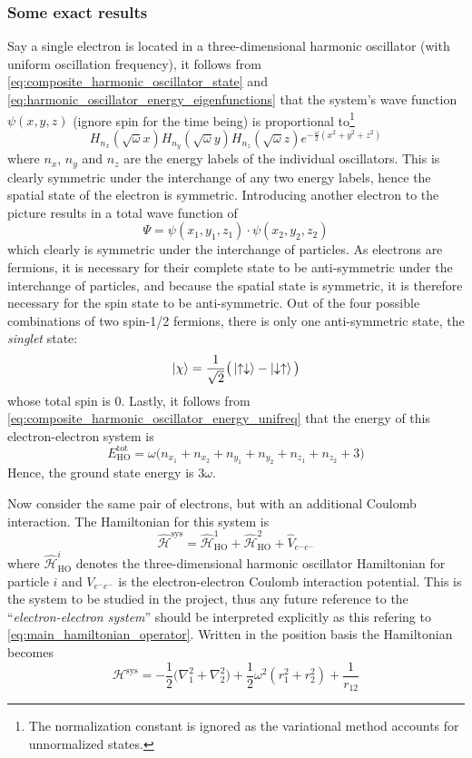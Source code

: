 \documentclass[nofootinbib,reprint,english]{revtex4-1}
\newcommand{\hatHH}{\hat{\mathcal{H}}}
\newcommand{\HH}{\mathcal{H}}
\begin{document}
\subsubsection{Some exact results}
Say a single electron is located in a three-dimensional harmonic oscillator (with uniform oscillation frequency), it follows from \eqref{eq:composite_harmonic_oscillator_state} and \eqref{eq:harmonic_oscillator_energy_eigenfunctions} that the system's wave function \(\psi(x,y,z)\) (ignore spin for the time being) is proportional to\footnote{The normalization constant is ignored as the variational method accounts for unnormalized states.}
\begin{equation*}
H_{n_x}(\sqrt{\omega}x)H_{n_y}(\sqrt{\omega}y)H_{n_z}(\sqrt{\omega}z)e^{-\displaystyle\frac{\omega}{2}(x^2+y^2+z^2)}
\end{equation*}
where \(n_x\), \(n_y\) and \(n_z\) are the energy labels of the individual oscillators. This is clearly symmetric under the interchange of any two energy labels, hence the spatial state of the electron is symmetric. Introducing another electron to the picture results in a total wave function of
\[\Psi=\psi(x_1,y_1,z_1)\cdot\psi(x_2,y_2,z_2)\]
which clearly is symmetric under the interchange of particles. As electrons are fermions, it is necessary for their complete state to be anti-symmetric under the interchange of particles, and because the spatial state is symmetric, it is therefore necessary for the spin state to be anti-symmetric. Out of the four possible combinations of two spin-1/2 fermions, there is only one anti-symmetric state, the \emph{singlet} state:
\[\ket{\chi}=\frac{1}{\sqrt{2}}\big(\ket{\uparrow\downarrow}-\ket{\downarrow\uparrow}\big)\]
whose total spin is 0. Lastly, it follows from \eqref{eq:composite_harmonic_oscillator_energy_unifreq} that the energy of this electron-electron system is
\begin{equation}
E_\text{HO}^\text{tot}=\omega\big(n_{x_1}+n_{x_2}+n_{y_1}+n_{y_2}+n_{z_1}+n_{z_2}+3\big)
\end{equation}
Hence, the ground state energy is \(3\omega\).

Now consider the same pair of electrons, but with an additional Coulomb interaction. The Hamiltonian for this system is
\begin{equation}\label{eq:main_hamiltonian_operator}
\hatHH^\text{sys}=\hatHH_\text{HO}^1+\hatHH_\text{HO}^2+\hat{V}_{e^-e^-}
\end{equation}
where \(\hatHH_\text{HO}^i\) denotes the three-dimensional harmonic oscillator Hamiltonian for particle \(i\) and \(V_{e^-e^-}\) is the electron-electron Coulomb interaction potential. This is the system to be studied in the project, thus any future reference to the ``\emph{electron-electron system}'' should be interpreted explicitly as this refering to \eqref{eq:main_hamiltonian_operator}. Written in the position basis the Hamiltonian becomes
\begin{equation}\label{eq:main_hamiltonian_position_basis}
\HH^\text{sys}=-\frac{1}{2}\big(\nabla_1^2+\nabla_2^2\big)+\frac{1}{2}\omega^2(r_1^2+r_2^2)+\frac{1}{r_{12}}
\end{equation}
\end{document}

